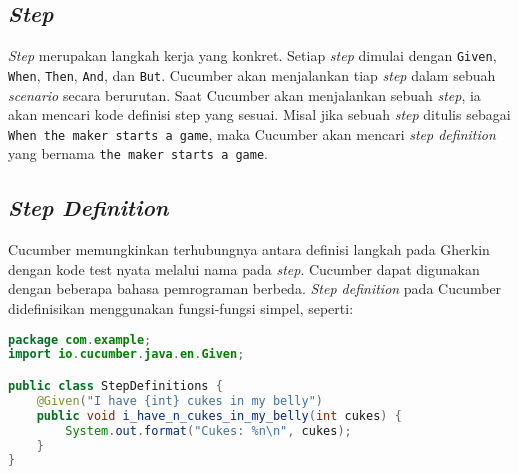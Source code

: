 
\subsection{\emph{Step}}

\emph{Step} merupakan langkah kerja yang konkret.
Setiap \emph{step} dimulai dengan \texttt{Given}, \texttt{When}, \texttt{Then},
\texttt{And}, dan \texttt{But}.
Cucumber akan menjalankan tiap \emph{step} dalam sebuah \emph{scenario} secara berurutan.
Saat Cucumber akan menjalankan sebuah \emph{step}, ia akan mencari kode definisi step yang sesuai.
Misal jika sebuah \emph{step} ditulis sebagai \texttt{When the maker starts a game},
maka Cucumber akan mencari \emph{step definition} yang bernama
\texttt{the maker starts a game}.

\subsection{\emph{Step Definition}}

Cucumber memungkinkan terhubungnya antara definisi langkah pada Gherkin
dengan kode test nyata melalui nama pada \emph{step}.
Cucumber dapat digunakan dengan beberapa bahasa pemrograman berbeda.
\emph{Step definition} pada Cucumber didefinisikan menggunakan fungsi-fungsi simpel, seperti:

\begin{lstlisting}[language=java]
package com.example;
import io.cucumber.java.en.Given;

public class StepDefinitions {
    @Given("I have {int} cukes in my belly")
    public void i_have_n_cukes_in_my_belly(int cukes) {
        System.out.format("Cukes: %n\n", cukes);
    }
}
\end{lstlisting}





